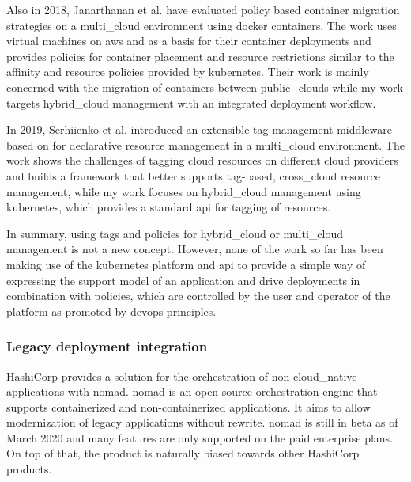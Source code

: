 \documentclass[../main.tex]{subfiles}
\begin{document}
    Also in 2018, Janarthanan et al.
    have evaluated policy based container migration strategies on a \gls{multi_cloud} environment using \gls{docker} containers.
    The work uses virtual machines on \acrshort{aws} and  as a basis for their container deployments and provides policies for container placement and resource restrictions similar to the affinity and resource policies provided by \gls{kubernetes}.
    Their work is mainly concerned with the migration of containers between \glspl{public_cloud} while my work targets \gls{hybrid_cloud} management with an integrated deployment workflow.\cite{policy_mc_migr}

    In 2019, Serhiienko et al.
    introduced an extensible tag management middleware based on  for declarative resource management in a \gls{multi_cloud} environment.
    The work shows the challenges of tagging \gls{cloud} resources on different \gls{cloud} providers and builds a framework that better supports tag-based, \gls{cross_cloud} resource management, while my work focuses on \gls{hybrid_cloud} management using \gls{kubernetes}, which provides a standard \acrshort{api} for tagging of resources.\cite{rw_ext_decl_mgmt}

    In summary, using tags and policies for \gls{hybrid_cloud} or \gls{multi_cloud} management is not a new concept.
    However, none of the work so far has been making use of the \gls{kubernetes} platform and \acrshort{api} to provide a simple way of expressing the support model of an application and drive deployments in combination with policies, which are controlled by the user and operator of the platform as promoted by \gls{devops} principles.

    \subsubsection{Legacy deployment integration}

    HashiCorp provides a solution for the orchestration of non-\gls{cloud_native} applications with \gls{nomad}.
    \gls{nomad} is an open-source orchestration engine that supports containerized and non-containerized applications.
    It aims to allow modernization of legacy applications without rewrite.
    \gls{nomad} is still in beta as of March 2020 and many features are only supported on the paid enterprise plans.
    On top of that, the product is naturally biased towards other HashiCorp products.\cite{hashicorp_nomad}
\end{document}
